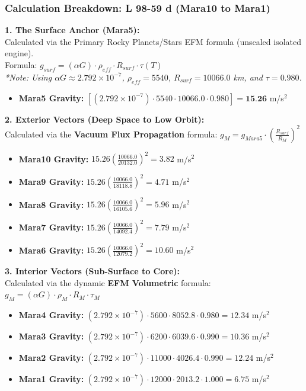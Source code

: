 \documentclass[11pt, a4paper]{article}
\begin{document}
\clearpage
\subsubsection{Calculation Breakdown: L 98-59 d (Mara10 to Mara1)}

\noindent \textbf{1. The Surface Anchor (Mara5):} \\
Calculated via the Primary Rocky Planets/Stars EFM formula (unscaled isolated engine). \\
Formula: $g_{surf} = (\alpha G) \cdot \rho_{eff} \cdot R_{surf} \cdot \tau(T)$ \\
\textit{*Note: Using $\alpha G \approx 2.792 \times 10^{-7}$, $\rho_{eff} = 5540$, $R_{surf} = 10066.0$ km, and $\tau = 0.980$.}
\begin{itemize}
  \item \textbf{Mara5 Gravity:} $\left[ (2.792 \times 10^{-7}) \cdot 5540 \cdot 10066.0 \cdot 0.980 \right] = \textbf{15.26}$ m/s$^2$
\end{itemize}

\vspace{0.5em}
\noindent \textbf{2. Exterior Vectors (Deep Space to Low Orbit):} \\
Calculated via the \textbf{Vacuum Flux Propagation} formula: $g_M = g_{Mara5} \cdot \left( \frac{R_{surf}}{R_M} \right)^2$
\begin{itemize}
  \item \textbf{Mara10 Gravity:} $15.26 \left( \frac{10066.0}{20132.0} \right)^2 = 3.82$ m/s$^2$
  \item \textbf{Mara9 Gravity:} $15.26 \left( \frac{10066.0}{18118.8} \right)^2 = 4.71$ m/s$^2$
  \item \textbf{Mara8 Gravity:} $15.26 \left( \frac{10066.0}{16105.6} \right)^2 = 5.96$ m/s$^2$
  \item \textbf{Mara7 Gravity:} $15.26 \left( \frac{10066.0}{14092.4} \right)^2 = 7.79$ m/s$^2$
  \item \textbf{Mara6 Gravity:} $15.26 \left( \frac{10066.0}{12079.2} \right)^2 = 10.60$ m/s$^2$
\end{itemize}

\vspace{0.5em}
\noindent \textbf{3. Interior Vectors (Sub-Surface to Core):} \\
Calculated via the dynamic \textbf{EFM Volumetric} formula: $g_M = (\alpha G) \cdot \rho_{M} \cdot R_M \cdot \tau_M$
\begin{itemize}
  \item \textbf{Mara4 Gravity:} $(2.792 \times 10^{-7}) \cdot 5600 \cdot 8052.8 \cdot 0.980 = 12.34$ m/s$^2$
  \item \textbf{Mara3 Gravity:} $(2.792 \times 10^{-7}) \cdot 6200 \cdot 6039.6 \cdot 0.990 = 10.36$ m/s$^2$
  \item \textbf{Mara2 Gravity:} $(2.792 \times 10^{-7}) \cdot 11000 \cdot 4026.4 \cdot 0.990 = 12.24$ m/s$^2$
  \item \textbf{Mara1 Gravity:} $(2.792 \times 10^{-7}) \cdot 12000 \cdot 2013.2 \cdot 1.000 = 6.75$ m/s$^2$
\end{itemize}
\end{document}
